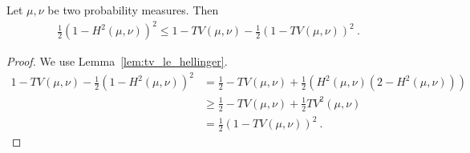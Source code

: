 \begin{corollary}
  \label{cor:one_sub_hellinger_squared_le_one_sub_tv}
  Let $\mu, \nu$ be two probability measures. Then
  \begin{align*}
  \frac{1}{2}(1 - H^2(\mu, \nu))^2 \le 1 - TV(\mu, \nu) - \frac{1}{2}(1 - TV(\mu, \nu))^2
  \: .
  \end{align*}
\end{corollary}

\begin{proof}
We use Lemma~\ref{lem:tv_le_hellinger}.
\begin{align*}
1 - TV(\mu, \nu) - \frac{1}{2}(1 - H^2(\mu, \nu))^2
&= \frac{1}{2} - TV(\mu, \nu) + \frac{1}{2}(H^2(\mu, \nu)(2 - H^2(\mu, \nu)))
\\
&\ge \frac{1}{2} - TV(\mu, \nu) + \frac{1}{2}TV^2(\mu, \nu)
\\
&= \frac{1}{2}(1 - TV(\mu, \nu))^2
\: .
\end{align*}
\end{proof}

